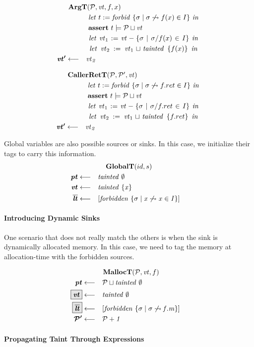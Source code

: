 \documentclass[acmsmall,review,anonymous]{acmart}\settopmatter{printfolios=true,printccs=false,printacmref=false}
\begin{document}
\begin{minipage}[t]{.49\textwidth}            
  \[\begin{aligned}
  \truledef{\argt}
  \letin{t := \mathit{forbid} ~ \{\sigma \mid \sigma \not \rightsquigarrow f(x) \in I\}}
  \assert{t \models \PCT \sqcup \vt}
  \letin{\vt_1 := \vt - \{\sigma \mid \sigma / f(x) \in I \}}
  \letin{\vt_2 := \vt_1 \sqcup \mathit{tainted} ~ \{f(x)\}}
  \settag{\vt'}{\vt_2}
  \end{aligned}\]
\end{minipage}
\begin{minipage}[t]{.49\textwidth}            
  \[\begin{aligned}
  \truledef{\callerrett}
  \letin{t := \mathit{forbid} ~ \{\sigma \mid \sigma \not \rightsquigarrow f.ret \in I\}}
  \assert{t \models \PCT \sqcup \vt}
  \letin{\vt_1 := \vt - \{\sigma \mid \sigma / f.ret \in I \}}
  \letin{\vt_2 := \vt_1 \sqcup \mathit{tainted} ~ \{f.ret\}}
  \settag{\vt'}{\vt_2}
  \end{aligned}\]
\end{minipage}

Global variables are also possible sources or sinks. In this case, we initialize their
tags to carry this information.
\[\begin{aligned}
\truledef{\globalt}
\settag{\pt}{\mathit{tainted} ~ \emptyset}
\settag{\vt}{\mathit{tainted} ~ \{x\}}
\settag{\overline{\lt}}{\left[\mathit{forbidden} ~ \{\sigma \mid x \not \rightsquigarrow x \in I\}\right]}
\end{aligned}\]

\paragraph{Introducing Dynamic Sinks}

One scenario that does not really match the others is when the sink is dynamically allocated
memory. In this case, we need to tag the memory at allocation-time with the forbidden
sources.

\[\begin{aligned}
\truledef{\malloct}
\settag{\pt}{\PCT \sqcup \mathit{tainted} ~ \emptyset}
\settagopt{\vt}{\mathit{tainted} ~ \emptyset}
\settagopt{\overline{\lt}}{\left[\mathit{forbidden} ~ \{\sigma \mid \sigma \not \rightsquigarrow f.m\} \right]}
\settag{\PCT'}{\PCT + 1}
\end{aligned}\]

\paragraph{Propagating Taint Through Expressions}
\end{document}
